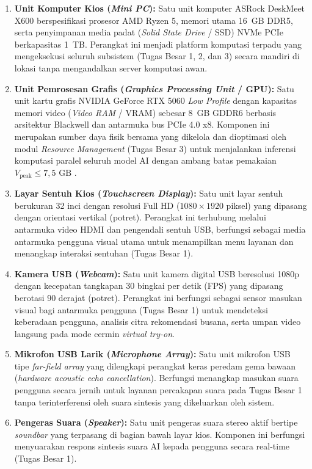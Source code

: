 \begin{enumerate}[label=\alph*.]
    \item \textbf{Unit Komputer Kios (\textit{Mini PC}):} Satu unit komputer ASRock DeskMeet X600 berspesifikasi prosesor AMD Ryzen 5, memori utama 16~GB DDR5, serta penyimpanan media padat (\textit{Solid State Drive} / SSD) NVMe PCIe berkapasitas 1~TB. Perangkat ini menjadi platform komputasi terpadu yang mengeksekusi seluruh subsistem (Tugas Besar 1, 2, dan 3) secara mandiri di lokasi tanpa mengandalkan server komputasi awan.
    
    \item \textbf{Unit Pemrosesan Grafis (\textit{Graphics Processing Unit} / GPU):} Satu unit kartu grafis NVIDIA GeForce RTX 5060 \textit{Low Profile} dengan kapasitas memori video (\textit{Video RAM} / VRAM) sebesar 8~GB GDDR6 berbasis arsitektur Blackwell dan antarmuka bus PCIe 4.0 x8. Komponen ini merupakan sumber daya fisik bersama yang dikelola dan dioptimasi oleh modul \textit{Resource Management} (Tugas Besar 3) untuk menjalankan inferensi komputasi paralel seluruh model AI dengan ambang batas pemakaian $V_{\text{peak}} \le 7{,}5\text{ GB}$ \cite{woo2025exploring}.
    
    \item \textbf{Layar Sentuh Kios (\textit{Touchscreen Display}):} Satu unit layar sentuh berukuran 32 inci dengan resolusi Full HD ($1080 \times 1920$ piksel) yang dipasang dengan orientasi vertikal (potret). Perangkat ini terhubung melalui antarmuka video HDMI dan pengendali sentuh USB, berfungsi sebagai media antarmuka pengguna visual utama untuk menampilkan menu layanan dan menangkap interaksi sentuhan (Tugas Besar 1).
    
    \item \textbf{Kamera USB (\textit{Webcam}):} Satu unit kamera digital USB beresolusi 1080p dengan kecepatan tangkapan 30 bingkai per detik (FPS) yang dipasang berotasi 90 derajat (potret). Perangkat ini berfungsi sebagai sensor masukan visual bagi antarmuka pengguna (Tugas Besar 1) untuk mendeteksi keberadaan pengguna, analisis citra rekomendasi busana, serta umpan video langsung pada mode cermin \textit{virtual try-on}.
    
    \item \textbf{Mikrofon USB Larik (\textit{Microphone Array}):} Satu unit mikrofon USB tipe \textit{far-field array} yang dilengkapi perangkat keras peredam gema bawaan (\textit{hardware acoustic echo cancellation}). Berfungsi menangkap masukan suara pengguna secara jernih untuk layanan percakapan suara pada Tugas Besar 1 tanpa terinterferensi oleh suara sintesis yang dikeluarkan oleh sistem.
    
    \item \textbf{Pengeras Suara (\textit{Speaker}):} Satu unit pengeras suara stereo aktif bertipe \textit{soundbar} yang terpasang di bagian bawah layar kios. Komponen ini berfungsi menyuarakan respons sintesis suara AI kepada pengguna secara real-time (Tugas Besar 1).
\end{enumerate}

